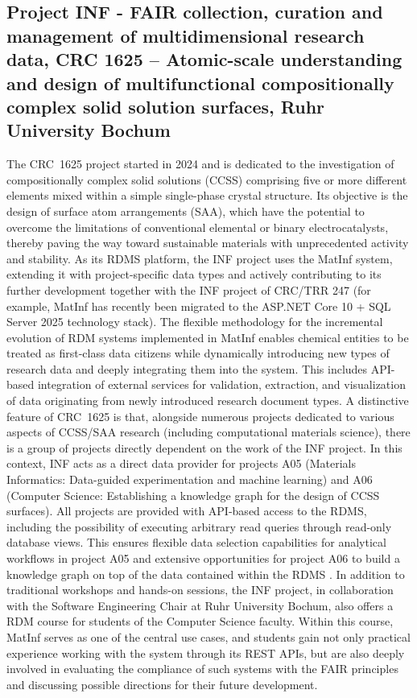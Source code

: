 \documentclass{eceasst}
\begin{document}
\subsection{Project INF - FAIR collection, curation and management of multidimensional research data, CRC 1625 – Atomic-scale understanding and design of multifunctional compositionally complex solid solution surfaces, Ruhr University Bochum}
The CRC~1625 project started in 2024 and is dedicated to the investigation of compositionally complex solid solutions (CCSS) comprising five or more different elements mixed within a simple single-phase crystal structure.
Its objective is the design of surface atom arrangements (SAA), which have the potential to overcome the limitations of conventional elemental or binary electrocatalysts, thereby paving the way toward sustainable materials with unprecedented activity and stability.
As its RDMS platform, the INF project uses the MatInf system, extending it with project-specific data types and actively contributing to its further development together with the INF project of CRC/TRR 247 (for example, MatInf has recently been migrated to the ASP.NET Core 10 + SQL Server 2025 technology stack).
The flexible methodology for the incremental evolution of RDM systems implemented in MatInf \cite{Dudarev2026} enables chemical entities to be treated as first-class data citizens while dynamically introducing new types of research data and deeply integrating them into the system.
This includes API-based integration of external services for validation, extraction, and visualization of data originating from newly introduced research document types.
A distinctive feature of CRC~1625 is that, alongside numerous projects dedicated to various aspects of CCSS/SAA research (including computational materials science), there is a group of projects directly dependent on the work of the INF project.
In this context, INF acts as a direct data provider for projects A05 (Materials Informatics: Data-guided experimentation and machine learning) and A06 (Computer Science: Establishing a knowledge graph for the design of CCSS surfaces).
All projects are provided with API-based access to the RDMS, including the possibility of executing arbitrary read queries through read-only database views.
This ensures flexible data selection capabilities for analytical workflows in project A05 and extensive opportunities for project A06 to build a knowledge graph on top of the data contained within the RDMS \cite{Mohamed2026}.
In addition to traditional workshops and hands-on sessions, the INF project, in collaboration with the Software Engineering Chair at Ruhr University Bochum, also offers a RDM course for students of the Computer Science faculty.
Within this course, MatInf serves as one of the central use cases, and students gain not only practical experience working with the system through its REST APIs, but are also deeply involved in evaluating the compliance of such systems with the FAIR principles and discussing possible directions for their future development.
\end{document}
